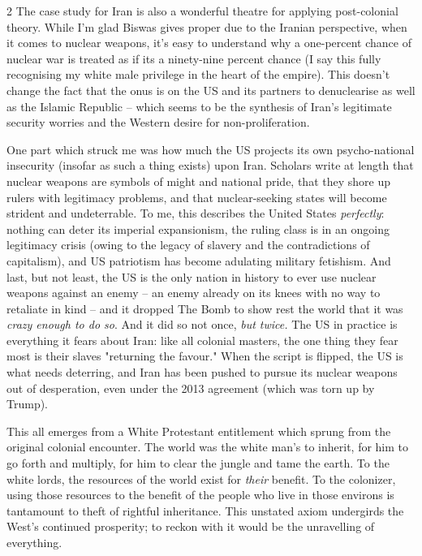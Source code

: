 \documentclass[letterpaper,12pt,twoside]{article}
\begin{document}
\begin {multicols}{2}
The case study for Iran is also a wonderful theatre for applying post-colonial theory. While I'm glad Biswas gives proper due to the Iranian perspective, when it comes to nuclear weapons, it's easy to understand why a one-percent chance of nuclear war is treated as if its a ninety-nine percent chance (I say this fully recognising my white male privilege in the heart of the empire). This doesn't change the fact that the onus is on the US and its partners to denuclearise as well as the Islamic Republic – which seems to be the synthesis of Iran's legitimate security worries and the Western desire for non-proliferation.

One part which struck me was how much the US projects its own psycho-national insecurity (insofar as such a thing exists) upon Iran. Scholars write at length that nuclear weapons are symbols of might and national pride, that they shore up rulers with legitimacy problems, and that nuclear-seeking states will become strident and undeterrable. To me, this describes the United States \textit{perfectly}: nothing can deter its imperial expansionism, the ruling class is in an ongoing legitimacy crisis (owing to the legacy of slavery and the contradictions of capitalism), and US patriotism has become adulating military fetishism. And last, but not least, the US is the only nation in history to ever use nuclear weapons against an enemy – an enemy already on its knees with no way to retaliate in kind – and it dropped The Bomb to show rest the world that it was \textit{crazy enough to do so}. And it did so not once, \textit{but twice.} The US in practice is everything it fears about Iran: like all colonial masters, the one thing they fear most is their slaves "returning the favour." When the script is flipped, the US is what needs deterring, and Iran has been pushed to pursue its nuclear weapons out of desperation, even under the 2013 agreement (which was torn up by Trump).

This all emerges from a White Protestant entitlement which sprung from the original colonial encounter. The world was the white man's to inherit, for him to go forth and multiply, for him to clear the jungle and tame the earth. To the white lords, the resources of the world exist for \textit{their} benefit. To the colonizer, using those resources to the benefit of the people who live in those environs is tantamount to theft of rightful inheritance. This unstated axiom undergirds the West's continued prosperity; to reckon with it would be the unravelling of everything.

\end{multicols}
\end{document}

